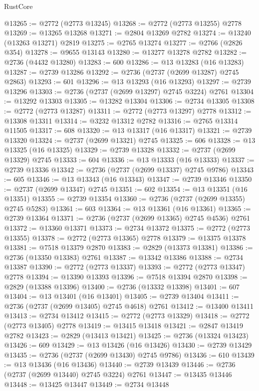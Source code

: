 \begin{lexlean}{RustCore}
\begin{coremodule}
@13265 := @2772 (@2773 @13245)
@13268 := @2772 (@2773 @13255) @2778
@13269 := @13265 @13268
@13271 := @2804 @13269 @2782
@13274 := @13240 (@13263 @13271) @2819
@13275 := @2765 @13274
@13277 := @2766 (@2826 @354)
@13278 := @9655 @13143
@13280 := @13277 @13278 @2782
@13282 := @2736 (@4432 @13280)
@13283 := 600
@13286 := @13 @13283 (@16 @13283)
@13287 := @2739 @13286
@13292 := @2736 (@2737 (@2699 @13287) @2745 @2863)
@13293 := 601
@13296 := @13 @13293 (@16 @13293)
@13297 := @2739 @13296
@13303 := @2736 (@2737 (@2699 @13297) @2745 @3224) @2761
@13304 := @13292 @13303
@13305 := @13282 @13304
@13306 := @2734 @13305
@13308 := @2772 (@2773 @13287)
@13311 := @2772 (@2773 @13297) @2778
@13312 := @13308 @13311
@13314 := @3232 @13312 @2782
@13316 := @2765 @13314 @11505
@13317 := 608
@13320 := @13 @13317 (@16 @13317)
@13321 := @2739 @13320
@13324 := @2737 (@2699 @13321) @2745
@13325 := 606
@13328 := @13 @13325 (@16 @13325)
@13329 := @2739 @13328
@13332 := @2737 (@2699 @13329) @2745
@13333 := 604
@13336 := @13 @13333 (@16 @13333)
@13337 := @2739 @13336
@13342 := @2736 (@2737 (@2699 @13337) @2745 @9786)
@13343 := 605
@13346 := @13 @13343 (@16 @13343)
@13347 := @2739 @13346
@13350 := @2737 (@2699 @13347) @2745
@13351 := 602
@13354 := @13 @13351 (@16 @13351)
@13355 := @2739 @13354
@13360 := @2736 (@2737 (@2699 @13355) @2745 @5283)
@13361 := 603
@13364 := @13 @13361 (@16 @13361)
@13365 := @2739 @13364
@13371 := @2736 (@2737 (@2699 @13365) @2745 @4536) @2761
@13372 := @13360 @13371
@13373 := @2734 @13372
@13375 := @2772 (@2773 @13355)
@13378 := @2772 (@2773 @13365) @2778
@13379 := @13375 @13378
@13381 := @7518 @13379 @2870
@13383 := @2829 (@13373 @13381)
@13386 := @2736 (@13350 @13383) @2761
@13387 := @13342 @13386
@13388 := @2734 @13387
@13390 := @2772 (@2773 @13337)
@13393 := @2772 (@2773 @13347) @2778
@13394 := @13390 @13393
@13396 := @7518 @13394 @2870
@13398 := @2829 (@13388 @13396)
@13400 := @2736 (@13332 @13398)
@13401 := 607
@13404 := @13 @13401 (@16 @13401)
@13405 := @2739 @13404
@13411 := @2736 (@2737 (@2699 @13405) @2745 @4618) @2761
@13412 := @13400 @13411
@13413 := @2734 @13412
@13415 := @2772 (@2773 @13329)
@13418 := @2772 (@2773 @13405) @2778
@13419 := @13415 @13418
@13421 := @2847 @13419 @2782
@13423 := @2829 (@13413 @13421)
@13425 := @2736 (@13324 @13423)
@13426 := 609
@13429 := @13 @13426 (@16 @13426)
@13430 := @2739 @13429
@13435 := @2736 (@2737 (@2699 @13430) @2745 @9786)
@13436 := 610
@13439 := @13 @13436 (@16 @13436)
@13440 := @2739 @13439
@13446 := @2736 (@2737 (@2699 @13440) @2745 @3224) @2761
@13447 := @13435 @13446
@13448 := @13425 @13447
@13449 := @2734 @13448

\end{coremodule}
\end{lexlean}
